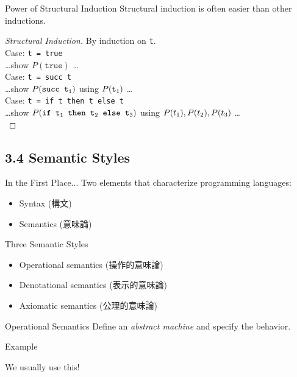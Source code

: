 \begin{frame}{Power of Structural Induction}
Structural induction is often easier than other inductions.
\begin{proof}[Structural Induction]
By induction on \texttt{t}.\\
Case: \texttt{t = true}\\
\dots show $P(\texttt{true})$ \dots\\
Case: \texttt{t = succ t}\\
\dots show $P(\texttt{succ t\textsubscript{1}})$ using $P(\texttt{t\textsubscript{1}})$ \dots\\
Case: \texttt{t = if t then t else t}\\
\dots show $P(\texttt{if t\textsubscript{1} then t\textsubscript{2} else t\textsubscript{3}})$ using $P(t\textsubscript{1}), P(t\textsubscript{2}), P(t\textsubscript{3})$ \dots\\
\end{proof}
\end{frame}

\subsection*{3.4 Semantic Styles}

\begin{frame}{In the First Place...}
Two elements that characterize programming languages:
\begin{itemize}
  \item Syntax (構文)
  \item Semantics (意味論)
\end{itemize}
\end{frame}

\begin{frame}{Three Semantic Styles}
\begin{itemize}
  \item Operational semantics (操作的意味論)
  \item Denotational semantics (表示的意味論)
  \item Axiomatic semantics (公理的意味論)
\end{itemize}
\end{frame}

\begin{frame}{Operational Semantics}
Define an \textit{abstract machine} and specify the behavior.
\begin{block}{Example}
\end{block}
We usually use this!
\end{frame}

